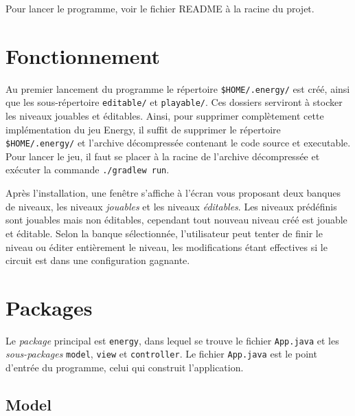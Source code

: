 \documentclass{article}
\begin{document}
\maketitle
{}

Pour lancer le programme, voir le fichier README à la racine du projet.

\section{Fonctionnement}
Au premier lancement du programme le répertoire {\tt \$HOME/.energy/} est créé,
ainsi que les sous-répertoire {\tt editable/} et {\tt playable/}. Ces dossiers
serviront à stocker les niveaux jouables et éditables. Ainsi, pour supprimer
complètement cette implémentation du jeu Energy, il suffit de supprimer le
répertoire {\tt \$HOME/.energy/} et l'archive décompressée contenant le code
source et executable. Pour lancer le jeu, il faut se placer à la racine de
l'archive décompressée et exécuter la commande {\tt ./gradlew run}.

Après l'installation, une fenêtre s'affiche à l'écran vous proposant deux
banques de niveaux, les niveaux {\em jouables} et les niveaux {\em éditables}.
Les niveaux prédéfinis sont jouables mais non éditables, cependant tout nouveau
niveau créé est jouable et éditable. Selon la banque sélectionnée, l'utilisateur
peut tenter de finir le niveau ou éditer entièrement le niveau, les
modifications étant effectives si le circuit est dans une configuration
gagnante.

\section{Packages}

Le {\em package} principal est {\tt energy}, dans lequel se trouve le fichier
{\tt App.java} et les {\em sous-packages} {\tt model}, {\tt view} et
{\tt controller}. Le fichier {\tt App.java} est le point d'entrée du programme,
celui qui construit l'application.

\subsection{Model}
\end{document}

